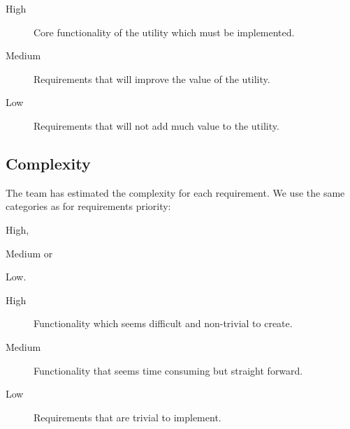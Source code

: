 \begin{description}
	\item[High] Core functionality of the utility which must be implemented.
	\item[Medium] Requirements that will improve the value of the utility.
	\item[Low] Requirements that will not add much value to the utility.
\end{description}

\subsection{Complexity}
\label{sec:req:compl}
The team has estimated the complexity for each requirement. We use the same
categories as for requirements priority:
\begin{inparaenum}
	\item High,
	\item Medium or
	\item Low.
\end{inparaenum} 

\begin{description}
	\item[High] Functionality which seems difficult and non-trivial to create.
	\item[Medium] Functionality that seems time consuming but straight forward.
	\item[Low] Requirements that are trivial to implement.
\end{description}

